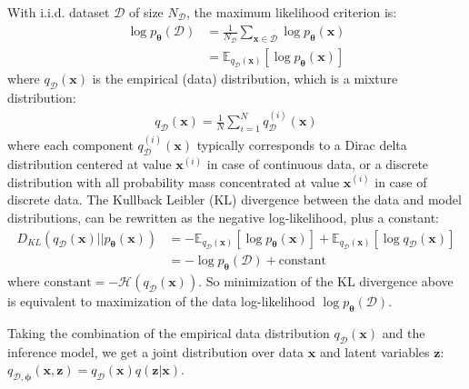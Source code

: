 \documentclass[MAL,biber]{nowfnt} %
\newcommand{\bb}[1]{\mathbf{#1}}
\newcommand{\bx}{\bb{x}}
\newcommand{\bz}{\bb{z}}
\newcommand{\bT}{\boldsymbol{\theta}}
\newcommand{\bphi}{\boldsymbol{\phi}}
\newcommand{\pT}{p_{\bT}}
\newcommand{\qD}{q_\mathcal{D}}
\newcommand{\qDP}{q_{\mathcal{D},\bphi}}
\newcommand{\Exp}[2]{\mathbb{E}_{#1}\left[#2\right]}
\begin{document}
 With i.i.d. dataset $\mathcal{D}$ of size $N_\mathcal{D}$, the maximum likelihood criterion is: 
\begin{align}
\log \pT(\mathcal{D})
&= \frac{1}{N_\mathcal{D}} \sum_{\bx \in \mathcal{D}} \log \pT(\bx)\\
&= \Exp{\qD(\bx)}{ \log \pT(\bx) }
\end{align}
where $\qD(\bx)$ is the empirical (data) distribution, which is a mixture distribution:
\begin{align}
\qD(\bx) = \frac{1}{N} \sum_{i=1}^N \qD^{(i)}(\bx)
\label{eq:empiricaldist}
\end{align}
where each component $\qD^{(i)}(\bx)$ typically corresponds to a Dirac delta distribution centered at value $\bx^{(i)}$ in case of continuous data, or a discrete distribution with all probability mass concentrated at value $\bx^{(i)}$ in case of discrete data. The Kullback Leibler (KL) divergence between the data and model distributions, can be rewritten as the negative log-likelihood, plus a constant:
\begin{align}
D_{KL}(\qD(\bx)||\pT(\bx))
&= - \Exp{\qD(\bx)}{ \log \pT(\bx) } + \Exp{\qD(\bx)}{\log \qD(\bx) }\\
&= - \log \pT(\mathcal{D}) + \text{constant}
\label{eq:marglikkl}
\end{align}
where $\text{constant} = - \mathcal{H}(\qD(\bx))$. So minimization of the KL divergence above is equivalent to maximization of the data log-likelihood $\log \pT(\mathcal{D})$.

Taking the combination of the empirical data distribution $\qD(\bx)$ and the inference model, we get a joint distribution over data $\bx$ and latent variables $\bz$: $\qDP(\bx,\bz) = \qD(\bx)q(\bz|\bx)$.
\end{document}
